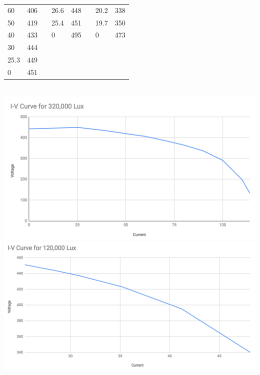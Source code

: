 \documentclass{article}
\begin{document}
\begin{table}[!ht]
\begin{tabular}{|l|l|l|l|l|l|l|l|}
60                     & 406               &                 & 26.6                   & 448               &                 & 20.2                   & 338               \\ \cline{1-2} \cline{4-5} \cline{7-8}
50                     & 419               &                 & 25.4                   & 451               &                 & 19.7                   & 350               \\ \cline{1-2} \cline{4-5} \cline{7-8}
40                     & 433               &                 & 0                      & 495               &                 & 0                      & 473               \\ \cline{1-2} \cline{4-5} \cline{7-8}
30                     & 444               &                 &                        &                   &                 &                        &                   \\ \cline{1-2} \cline{4-5} \cline{7-8}
25.3                   & 449               &                 &                        &                   &                 &                        &                   \\ \cline{1-2} \cline{4-5} \cline{7-8}
0                      & 451               &                 &                        &                   &                 &                        &                   \\ \cline{1-2} \cline{4-5} \cline{7-8}
\end{tabular}
\end{table}
\\
\includegraphics[scale=0.3]{ivcurve1}
\\
\includegraphics[scale=0.4]{ivcurve2}
\end{document}
